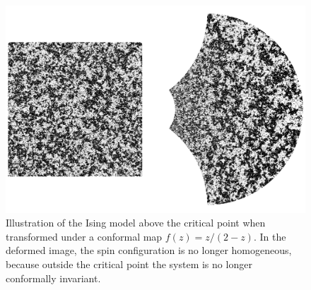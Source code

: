 \begin{figure}
\begin{center}
    \includegraphics[scale=0.4]{chapters/ch3-conf/figs/isingcm2}
\end{center}
\caption{Illustration of the Ising model above the critical point when
    transformed under a conformal map $f(z)=z/(2-z)$. In the deformed image,
    the spin configuration is no longer homogeneous, because outside the
    critical point the system is no longer conformally invariant.}
\label{fig:isingcm2}
\end{figure}
